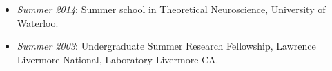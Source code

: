 \begin{itemize}
\tightlist
\item
  \emph{Summer 2014}: Summer school in Theoretical Neuroscience,
  University of Waterloo.
\item
  \emph{Summer 2003}: Undergraduate Summer Research Fellowship, Lawrence
  Livermore National, Laboratory Livermore CA.
\end{itemize}
